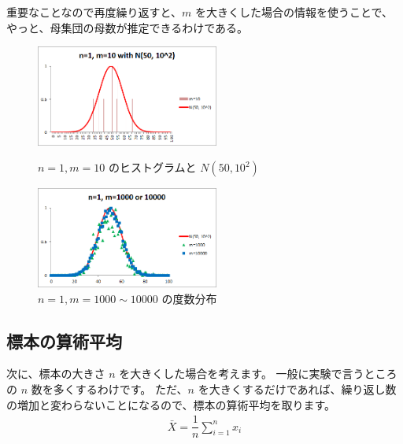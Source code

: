 \documentclass[uplatex,11pt,a4paper]{jsarticle}
\begin{document}
重要なことなので再度繰り返すと、$m$ を大きくした場合の情報を使うことで、やっと、母集団の母数が推定できるわけである。
\begin{figure}[htb]
\begin{minipage}{0.5\hsize}
 \centering
	\includegraphics[width=6cm]{./figs/n1m10.png}
	\caption{$n=1, m=10$ のヒストグラムと $N(50, 10^2)$ }
	\label{fig: m10}
\end{minipage}
\begin{minipage}{0.5\hsize}
 \centering
	\includegraphics[width=6cm]{./figs/n1m1000_10000.png}
	\caption{$n=1, m=1000 \sim 10000$ の度数分布 }
	\label{fig: m10000}
\end{minipage}
\end{figure}

\subsection{標本の算術平均}

次に、標本の大きさ $n$ を大きくした場合を考えます。
一般に実験で言うところの $n$ 数を多くするわけです。
ただ、$n$ を大きくするだけであれば、繰り返し数の増加と変わらないことになるので、標本の算術平均を取ります。
\begin{align*}
\bar{X} = \dfrac{1}{n} \sum_{i=1}^n x_i
\end{align*}
\end{document}
